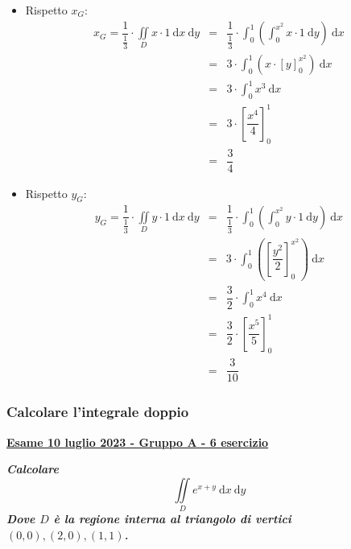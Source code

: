 \documentclass[a4paper]{article}
\newcommand{\definition}[1]{\textcolor{Red3}{\textbf{#1}}}
\newcommand{\example}[1]{\textcolor{Green4}{\textbf{#1}}}
\begin{document}
	\begin{itemize}
		\item Rispetto $x_{G}$:
		\begin{equation*}
			\begin{array}{rcl}
				x_{G} = \dfrac{1}{\frac{1}{3}} \cdot \displaystyle\iint\limits_{D} x \cdot 1 \:\mathrm{d}x\:\mathrm{d}y
				&=&
				\dfrac{1}{\frac{1}{3}} \cdot\displaystyle\int_{0}^{1} \left(\int_{0}^{x^{2}} x \cdot 1 \:\mathrm{d}y\right) \:\mathrm{d}x \\ [1.5em]
				&=&
				3 \cdot \displaystyle\int_{0}^{1} \left(x \cdot \left[y\right]_{0}^{x^{2}}\right) \:\mathrm{d}x \\ [1.5em]
				&=&
				3 \cdot \displaystyle\int_{0}^{1} x^{3} \:\mathrm{d}x \\ [1.5em]
				&=&
				3 \cdot \left[\dfrac{x^{4}}{4}\right]_{0}^{1} \\ [1em]
				&=&
				\dfrac{3}{4}
			\end{array}
		\end{equation*}

		\item Rispetto $y_{G}$:
		\begin{equation*}
			\begin{array}{rcl}
				y_{G} = \dfrac{1}{\frac{1}{3}} \cdot \displaystyle\iint\limits_{D} y \cdot 1 \:\mathrm{d}x\:\mathrm{d}y
				&=&
				\dfrac{1}{\frac{1}{3}} \cdot\displaystyle\int_{0}^{1} \left(\int_{0}^{x^{2}} y \cdot 1 \:\mathrm{d}y\right) \:\mathrm{d}x \\ [1.5em]
				&=&
				3 \cdot \displaystyle\int_{0}^{1} \left(\left[\dfrac{y^{2}}{2}\right]_{0}^{x^{2}}\right) \:\mathrm{d}x \\ [1.5em]
				&=&
				\dfrac{3}{2} \cdot \displaystyle\int_{0}^{1} x^{4} \:\mathrm{d}x \\ [1.5em]
				&=&
				\dfrac{3}{2} \cdot \left[\dfrac{x^{5}}{5}\right]_{0}^{1} \\ [1em]
				&=&
				\dfrac{3}{10}
			\end{array}
		\end{equation*}
	\end{itemize}

	\newpage

	\subsubsection{Calcolare l'integrale doppio}
	\begin{flushleft}
		\label{exam: esame 10 luglio 2023 - Gruppo A - 6 esercizio}
		\hypertarget{
			exam: esame 10 luglio 2023 - Gruppo A - 6 esercizio
		}{
			\definition{\underline{Esame 10 luglio 2023 - Gruppo A - 6 esercizio}}
		}
	\end{flushleft}
	\example{\emph{Calcolare}
	\begin{equation*}
		\displaystyle\iint\limits_{D} e^{x+y} \:\mathrm{d}x\:\mathrm{d}y
	\end{equation*}
	\emph{Dove $D$ è la regione interna al triangolo di vertici $\left(0,0\right), \left(2,0\right), \left(1,1\right)$.}}\newline
\end{document}
